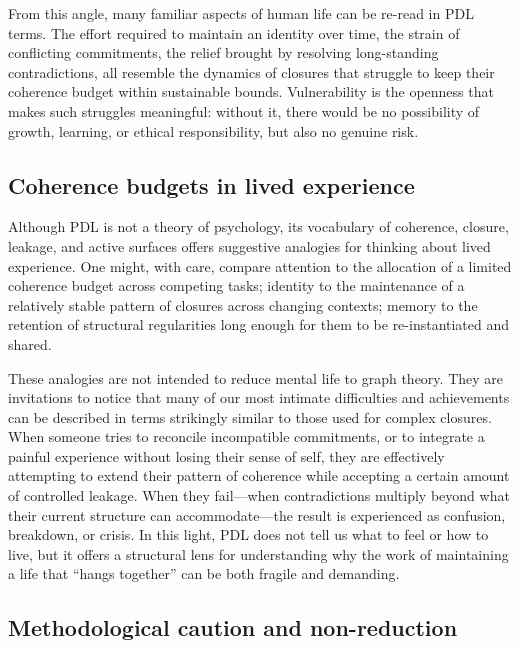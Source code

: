 \documentclass[11pt,a4paper]{article}
\theoremstyle{definition}
\begin{document}
From this angle, many familiar aspects of human life can be re-read in PDL terms. The effort required to maintain an identity over time, the strain of conflicting commitments, the relief brought by resolving long-standing contradictions, all resemble the dynamics of closures that struggle to keep their coherence budget within sustainable bounds.\cite{Laubscher_Existence_PulsatingClosure_2026} Vulnerability is the openness that makes such struggles meaningful: without it, there would be no possibility of growth, learning, or ethical responsibility, but also no genuine risk.

\subsection{Coherence budgets in lived experience}

Although PDL is not a theory of psychology, its vocabulary of coherence, closure, leakage, and active surfaces offers suggestive analogies for thinking about lived experience.\cite{Laubscher_Existence_PulsatingClosure_2026} One might, with care, compare attention to the allocation of a limited coherence budget across competing tasks; identity to the maintenance of a relatively stable pattern of closures across changing contexts; memory to the retention of structural regularities long enough for them to be re-instantiated and shared.

These analogies are not intended to reduce mental life to graph theory. They are invitations to notice that many of our most intimate difficulties and achievements can be described in terms strikingly similar to those used for complex closures. When someone tries to reconcile incompatible commitments, or to integrate a painful experience without losing their sense of self, they are effectively attempting to extend their pattern of coherence while accepting a certain amount of controlled leakage. When they fail—when contradictions multiply beyond what their current structure can accommodate—the result is experienced as confusion, breakdown, or crisis. In this light, PDL does not tell us what to feel or how to live, but it offers a structural lens for understanding why the work of maintaining a life that “hangs together” can be both fragile and demanding.

\subsection{Methodological caution and non-reduction}
\end{document}
